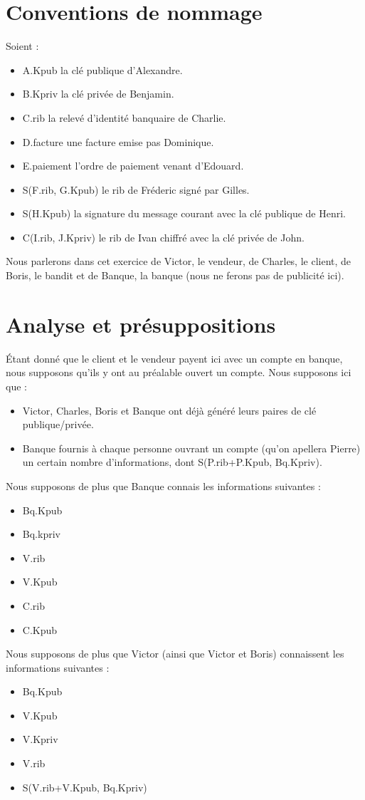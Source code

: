 \documentclass[oneside,10pt]{article}
\begin{document}
\section{Conventions de nommage}
Soient :
\begin{itemize}
\item A.Kpub la cl\'e publique d'Alexandre.
\item B.Kpriv la cl\'e priv\'ee de Benjamin.
\item C.rib la relev\'e d'identit\'e banquaire de Charlie.
\item D.facture une facture emise pas Dominique.
\item E.paiement l'ordre de paiement venant d'Edouard.
\item S(F.rib, G.Kpub) le rib de Fr\'ederic sign\'e par Gilles.
\item S(H.Kpub) la signature du message courant avec la cl\'e publique de Henri.
\item C(I.rib, J.Kpriv) le rib de Ivan chiffr\'e avec la cl\'e priv\'ee de John.
\end{itemize}
Nous parlerons dans cet exercice de Victor, le vendeur, de Charles, le client, de Boris, le bandit et de Banque, la banque (nous ne ferons pas de publicit\'e ici).

\section{Analyse et pr\'esuppositions}
\'Etant donn\'e que le client et le vendeur payent ici avec un compte en banque, nous supposons qu'ils y ont au pr\'ealable ouvert un compte. Nous supposons ici que :
\begin{itemize}
\item Victor, Charles, Boris et Banque ont d\'ej\`a g\'en\'er\'e leurs paires de cl\'e publique/priv\'ee.
\item Banque fournis \`a chaque personne ouvrant un compte (qu'on apellera Pierre) un certain nombre d'informations, dont S(P.rib+P.Kpub, Bq.Kpriv).
\end{itemize}
Nous supposons de plus que Banque connais les informations suivantes :
\begin{itemize}
\item Bq.Kpub
\item Bq.kpriv
\item V.rib
\item V.Kpub
\item C.rib
\item C.Kpub
\end{itemize}
Nous supposons de plus que Victor (ainsi que Victor et Boris) connaissent les informations suivantes :
\begin{itemize}
\item Bq.Kpub
\item V.Kpub
\item V.Kpriv
\item V.rib
\item S(V.rib+V.Kpub, Bq.Kpriv)
\end{itemize}
\end{document}
